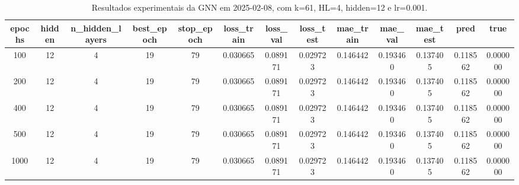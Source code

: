 \begin{table}[h]
\centering
\caption{Resultados experimentais da GNN em 2025-02-08, com k=61, HL=4, hidden=12 e lr=0.001.}
\label{tab:gnn_results_k61_hl4_h12_d20250208}
\begin{tabular}{ccccccccccccc}
\toprule
epochs & hidden & n\_hidden\_layers & best\_epoch & stop\_epoch & loss\_train & loss\_val & loss\_test & mae\_train & mae\_val & mae\_test & pred & true \\
\midrule
100 & 12 & 4 & 19 & 79 & 0.030665 & 0.089171 & 0.029723 & 0.146442 & 0.193460 & 0.137405 & 0.118562 & 0.000000 \\
200 & 12 & 4 & 19 & 79 & 0.030665 & 0.089171 & 0.029723 & 0.146442 & 0.193460 & 0.137405 & 0.118562 & 0.000000 \\
400 & 12 & 4 & 19 & 79 & 0.030665 & 0.089171 & 0.029723 & 0.146442 & 0.193460 & 0.137405 & 0.118562 & 0.000000 \\
500 & 12 & 4 & 19 & 79 & 0.030665 & 0.089171 & 0.029723 & 0.146442 & 0.193460 & 0.137405 & 0.118562 & 0.000000 \\
1000 & 12 & 4 & 19 & 79 & 0.030665 & 0.089171 & 0.029723 & 0.146442 & 0.193460 & 0.137405 & 0.118562 & 0.000000 \\
\bottomrule
\end{tabular}
\end{table}
